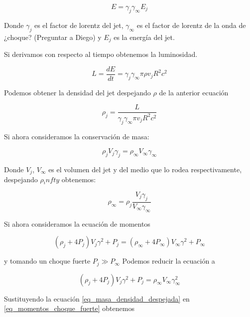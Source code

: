\documentclass[12pt,a4paper]{book}
\begin{document}
\begin{equation}
  E = \gamma_{j} \gamma_{\infty} E_j
\end{equation}

Donde $\gamma_j$ es el factor de lorentz del jet, $\gamma_{\infty}$ es el factor de lorentz de la onda de ¿choque? (Preguntar a Diego) y $E_j$ es la energía 
del jet.

Si derivamos con respecto al tiempo obtenemos la luminosidad.


\begin{equation}
  L = \dfrac{dE}{dt} = \gamma_{j} \gamma_{\infty}  \pi \rho v_j R^2 c^2
\end{equation}

Podemos obtener la densidad del jet despejando $\rho$ de la anterior ecuación

\begin{equation}
  \rho_j = \frac{L}{\gamma_{j} \gamma_{\infty}  \pi v_j R^2 c^2}
\end{equation}

Si ahora consideramos la conservación de masa:

\begin{equation}
  \rho_j V_j \gamma_j=  \rho_{\infty} V_{\infty} \gamma_{\infty}
\end{equation}

Donde $V_j$, $V_\infty$ es el volumen del jet y del medio que lo rodea respectivamente, despejando $\rho{_infty}$ obtenemos:

\begin{equation}\label{eq_masa_densidad_despejada}
  \rho_\infty = \rho_j \frac{V_j \gamma_j }{V_\infty \gamma_\infty}
\end{equation}

Si ahora consideramos la ecuación de momentos

\begin{equation}
  \left( \rho_j + 4P_j \right)V_j \gamma^2 +P_j = \left( \rho_\infty + 4P_\infty \right)V_\infty \gamma^2 +P_\infty
\end{equation}

y tomando un choque fuerte $P_j \gg P_\infty $ Podemos reducir la ecuación a 

\begin{equation} \label{eq_momentos_choque_fuerte}
  \left( \rho_j + 4P_j \right)V_j \gamma^2 +P_j =  \rho_\infty  V_\infty \gamma_{\infty}^{2} 
\end{equation}

Sustituyendo la ecuación \ref{eq_masa_densidad_despejada} en \ref{eq_momentos_choque_fuerte} obtenemos
\end{document}
